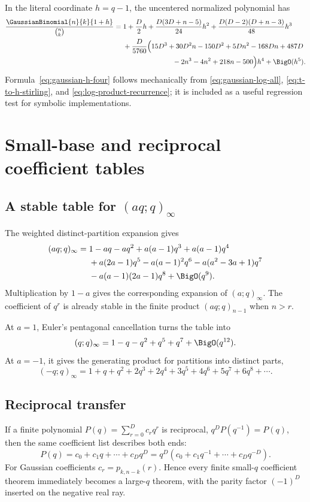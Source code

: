 \documentclass[11pt,oneside]{article}
\theoremstyle{definition}
\theoremstyle{remark}
\let\reporttopsection\section
\let\reportsubsection\subsection
\let\chapter\reporttopsection
\let\section\reportsubsection
\begin{document}
In the literal coordinate $h=q-1$, the uncentered normalized polynomial has
\begin{align}
 \frac{\GaussianBinomial{n}{k}{1+h}}{\binom nk}
 ={}&1+\frac D2h
 +\frac{D(3D+n-5)}{24}h^2
 +\frac{D(D-2)(D+n-3)}{48}h^3\notag\\
 &+\frac{D}{5760}\Bigl(
 15D^3+30D^2n-150D^2+5Dn^2-168Dn+487D\notag\\
 &\hspace{7.1em}{}-2n^3-4n^2+218n-500
 \Bigr)h^4+\BigO(h^5).
 \label{eq:gaussian-h-four}
\end{align}
Formula~\eqref{eq:gaussian-h-four} follows mechanically from
\eqref{eq:gaussian-log-all}, \eqref{eq:t-to-h-stirling}, and
\eqref{eq:log-product-recurrence}; it is included as a useful regression test
for symbolic implementations.

\chapter{Small-base and reciprocal coefficient tables}\label{app:small-base}

\section{A stable table for \texorpdfstring{$(aq;q)_\infty$}{the infinite aq product}}

The weighted distinct-partition expansion gives
\begin{align*}
 (aq;q)_\infty={}&1-aq-aq^2+a(a-1)q^3+a(a-1)q^4\\
 &+a(2a-1)q^5-a(a-1)^2q^6-a(a^2-3a+1)q^7\\
 &-a(a-1)(2a-1)q^8+\BigO(q^9).
\end{align*}
Multiplication by $1-a$ gives the corresponding expansion of
$(a;q)_\infty$.  The coefficient of $q^r$ is already stable in the finite
product $(aq;q)_{n-1}$ when $n>r$.

At $a=1$, Euler's pentagonal cancellation turns the table into
\[
 (q;q)_\infty
 =1-q-q^2+q^5+q^7+\BigO(q^{12}).
\]
At $a=-1$, it gives the generating product for partitions into distinct parts,
\[
 (-q;q)_\infty
 =1+q+q^2+2q^3+2q^4+3q^5+4q^6+5q^7+6q^8+\cdots.
\]

\section{Reciprocal transfer}

If a finite polynomial $P(q)=\sum_{r=0}^{D}c_rq^r$ is reciprocal,
$q^DP(q^{-1})=P(q)$, then the same coefficient list describes both ends:
\[
 P(q)=c_0+c_1q+\cdots+c_Dq^D
 =q^D\left(c_0+c_1q^{-1}+\cdots+c_Dq^{-D}\right).
\]
For Gaussian coefficients $c_r=p_{k,n-k}(r)$.  Hence every finite small-$q$
coefficient theorem immediately becomes a large-$q$ theorem, with the parity
factor $(-1)^D$ inserted on the negative real ray.
\end{document}
